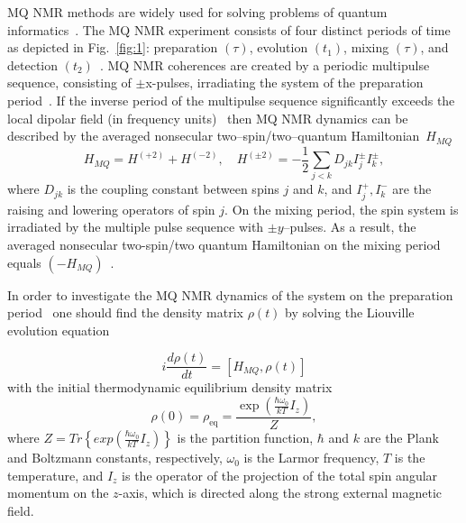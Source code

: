 \documentclass[preprint,12pt]{elsarticle}
\begin{document}
MQ NMR methods are widely used for solving problems of quantum informatics~\cite{17,18}.
The MQ NMR experiment consists of four distinct periods of time as depicted in Fig.~\ref{fig:1}:
preparation $(\tau)$, evolution $(t_1)$, mixing $(\tau)$, and detection $(t_2)$~\cite{10}.
MQ NMR coherences are created by a periodic multipulse sequence, consisting of
$\pm$x-pulses, irradiating the system of the preparation period~\cite{10}.
If the inverse period of the multipulse sequence significantly exceeds the local dipolar field (in frequency units)~\cite{19} then
MQ NMR dynamics can be described by the averaged nonsecular two--spin/two--quantum Hamiltonian~$H_{MQ}$~\cite{20}
%
\begin{equation} \label{eq:1}
        H_{MQ} = H^{(+2)} + H^{(-2)} , \quad
        H^{(\pm 2)} = -\frac{1}{2} \sum_{j<k} D_{jk} I_{j} ^\pm I_k^\pm,
\end{equation}
%
where $D_{jk}$ is the coupling constant between spins $j$ and $k$,
and $I_{j}^+, I_k ^-$ are the raising and lowering operators of spin $j$.
On the mixing period, the spin system is irradiated by the multiple pulse sequence with $\pm y$--pulses.
As a result, the averaged nonsecular two-spin/two quantum Hamiltonian on the mixing period equals $(-H_{MQ})$~\cite{10}.


In order to investigate the MQ NMR dynamics of the system on the preparation period~\cite{10} one should find the density matrix $\rho(t)$ by solving the Liouville evolution equation~\cite{19}

\begin{equation}
    \label{eq:2}
        i\frac{d\rho(t)}{dt} = [H_{MQ}, \rho(t)]
\end{equation}
with the initial thermodynamic equilibrium density matrix
\begin{equation}
    \label{eq:3}
        \rho(0) = \rho_\mathrm{eq} = \frac{\exp(\frac{\hbar \omega_0}{kT}I_z)}{Z},
\end{equation}
where $Z=Tr \left\{exp\left(\frac{\hbar \omega_0}{kT}I_z\right) \right\}$ is the partition function,
$\hbar$ and $k$ are the Plank and Boltzmann constants, respectively,
$\omega_0$ is the Larmor frequency,
$T$ is the temperature,
and $I_z$ is the operator of the projection of the total spin angular momentum on the $z$-axis,
which is directed along the strong external magnetic field.
\end{document}

